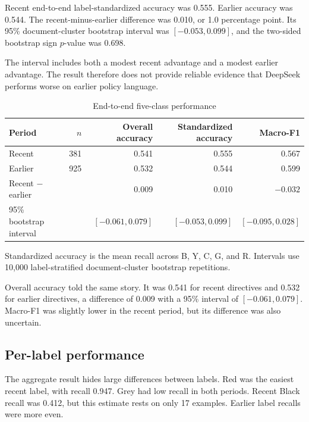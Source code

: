 \documentclass[11pt]{article}
\begin{document}
Recent end-to-end label-standardized accuracy was 0.555. Earlier accuracy was 0.544. The recent-minus-earlier difference was 0.010, or 1.0 percentage point. Its 95\% document-cluster bootstrap interval was $[-0.053, 0.099]$, and the two-sided bootstrap sign $p$-value was 0.698.

The interval includes both a modest recent advantage and a modest earlier advantage. The result therefore does not provide reliable evidence that DeepSeek performs worse on earlier policy language.

\begin{table}[ht]
\centering
\caption{End-to-end five-class performance}
\label{tab:main}
\begin{threeparttable}
\begin{tabular}{lrrrr}
\toprule
Period & $n$ & Overall accuracy & Standardized accuracy & Macro-F1 \\
\midrule
Recent & 381 & 0.541 & 0.555 & 0.567 \\
Earlier & 925 & 0.532 & 0.544 & 0.599 \\
\midrule
Recent $-$ earlier & & 0.009 & 0.010 & $-0.032$ \\
95\% bootstrap interval & & $[-0.061,0.079]$ & $[-0.053,0.099]$ & $[-0.095,0.028]$ \\
\bottomrule
\end{tabular}
\begin{tablenotes}[flushleft]\footnotesize
\item Standardized accuracy is the mean recall across B, Y, C, G, and R. Intervals use 10,000 label-stratified document-cluster bootstrap repetitions.
\end{tablenotes}
\end{threeparttable}
\end{table}

Overall accuracy told the same story. It was 0.541 for recent directives and 0.532 for earlier directives, a difference of 0.009 with a 95\% interval of $[-0.061,0.079]$. Macro-F1 was slightly lower in the recent period, but its difference was also uncertain.

\subsection{Per-label performance}

The aggregate result hides large differences between labels. Red was the easiest recent label, with recall 0.947. Grey had low recall in both periods. Recent Black recall was 0.412, but this estimate rests on only 17 examples. Earlier label recalls were more even.
\end{document}
